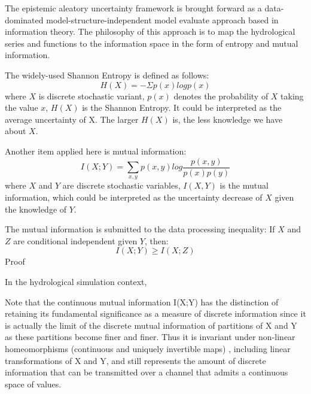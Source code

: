 {}

The epistemic aleatory uncertainty framework is brought 
forward as a data-dominated model-structure-independent 
model evaluate approach based in information theory. The 
philosophy of this approach is to map the hydrological 
series and functions to the information space in the form 
of entropy and mutual information.

The widely-used Shannon Entropy is defined as follows:
\begin{equation}
H(X)=-\Sigma p(x)logp(x)
\end{equation}
where $X$ is discrete stochastic variant, $p(x)$ denotes 
the probability of $X$ taking the value $x$, $H(X)$ is the 
Shannon Entropy.
It could be interpreted as the average uncertainty of X. 
The larger $H(X)$ is, the less knowledge we have about $X$.

Another item applied here is mutual information:
\begin{equation}
I(X;Y)=\sum_{x,y}p(x,y)log\frac{p(x,y)}{p(x)p(y)}
\end{equation}
where $X$ and $Y$ are discrete stochastic variables,
$I(X,Y)$ is the mutual information, which could be 
interpreted as the uncertainty decrease of $X$ given the 
knowledge of $Y$.

The mutual information is submitted to the data processing 
inequality:
If $X$ and $Z$ are conditional independent given $Y$, then:
\begin{equation}
I(X;Y) \geq I(X;Z)
\end{equation}
Proof

In the hydrological simulation context,






 

Note that the continuous mutual information I(X;Y) has the 
distinction of retaining its fundamental significance as a 
measure of discrete information since it is actually the 
limit of the discrete mutual information of partitions of X 
and Y as these partitions become finer and finer. Thus it 
is invariant under non-linear homeomorphisms (continuous 
and uniquely invertible maps) ,\cite{} including linear
\cite{} transformations of X and Y, and still represents 
the amount of discrete information that can be transmitted 
over a channel that admits a continuous space of values.


